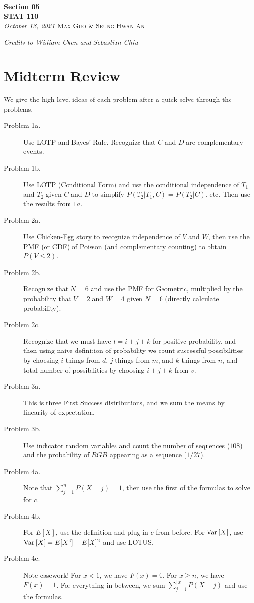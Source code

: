 \documentclass[11pt]{article}
\theoremstyle{definition}
\theoremstyle{remark}
\renewcommand{\var}[1]{\textnormal{Var}\left[ #1 \right]}
\newcommand{\inserttitle}{Section 05}
\newcommand{\insertauthor}{Max Guo \& Seung Hwan An}
\newcommand{\insertcourse}{STAT 110}
\begin{document}
{\noindent\Huge\bf  \\[0.1\baselineskip] {\inserttitle }}\\[2\baselineskip]
{{\bf \insertcourse}\\ {\textit{October 18, 2021}}} \hfill {\large \textsc{\insertauthor}}
\smallskip

\hfill \noindent \textit{Credits to William Chen and Sebastian Chiu}


\section{Midterm Review}

We give the high level ideas of each problem after a quick solve through the problems. 

\begin{description}
\item[Problem 1a.] Use LOTP and Bayes' Rule. Recognize that $C$ and $D$ are complementary events. 
\item[Problem 1b.] Use LOTP (Conditional Form) and use the conditional independence of $T_1$ and $T_2$ given $C$ and $D$ to simplify $P(T_2 | T_1, C) = P(T_2 | C)$, etc. Then use the results from $1a$.
\item[Problem 2a.] Use Chicken-Egg story to recognize independence of $V$ and $W$, then use the PMF (or CDF) of Poisson (and complementary counting) to obtain $P(V \le 2)$.
\item[Problem 2b.] Recognize that $N = 6$ and use the PMF for Geometric, multiplied by the probability that $V = 2$ and $W = 4$ given $N = 6$ (directly calculate probability).
\item[Problem 2c.] Recognize that we must have $t = i + j + k$ for positive probability, and then using naive definition of probability we count successful possibilities by choosing $i$ things from $d$, $j$ things from $m$, and $k$ things from $n$, and total number of possibilities by choosing $i + j + k$ from $v$.
\item[Problem 3a.] This is three First Success distributions, and we sum the means by linearity of expectation.
\item[Problem 3b.] Use indicator random variables and count the number of sequences ($108$) and the probability of $RGB$ appearing as a sequence ($1/27$).
\item[Problem 4a.] Note that $\sum_{j=1}^n P(X = j) = 1$, then use the first of the formulas to solve for $c$.
\item[Problem 4b.] For $E[X]$, use the definition and plug in $c$ from before. For $\var X$, use $\var X = E[X^2] - E[X]^2$ and use LOTUS. 
\item[Problem 4c.] Note casework! For $x < 1$, we have $F(x) = 0$. For $x \ge n$, we have $F(x) = 1$. For everything in between, we sum $\sum_{j=1}^{\lfloor x \rfloor} P(X = j)$ and use the formulas.
\end{description}
\end{document}
